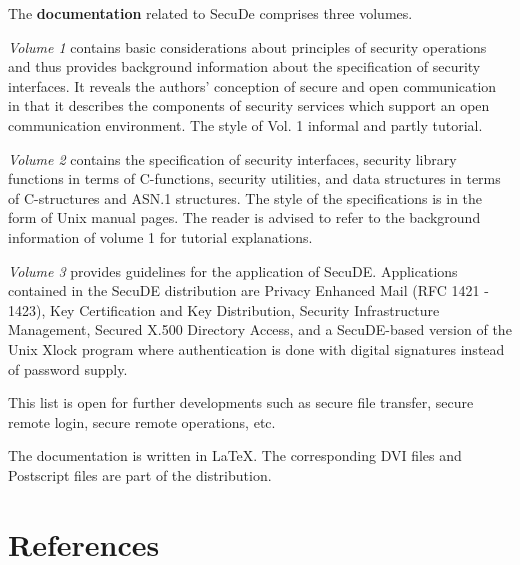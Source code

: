 The {\bf documentation} related to SecuDe comprises three volumes.

{\em Volume 1} contains basic considerations
about principles of security operations and thus provides
background information about the specification of security interfaces.
It reveals
the authors' conception of secure and open communication
in that it describes
the components of security services
which support an open communication environment.
The style of Vol. 1 informal and
partly tutorial.

{\em Volume 2} contains the specification of security interfaces,
security library functions in terms of C-functions, security
utilities, and data structures in terms of C-structures
and ASN.1 structures.
The style of the specifications is in the form of 
Unix manual pages.
The reader is advised to refer to the background information
of volume 1 for tutorial explanations.

{\em Volume 3}  provides guidelines for the application of  SecuDE.
Applications contained in the SecuDE distribution are Privacy Enhanced 
Mail (RFC 1421 - 1423), Key Certification and Key Distribution, Security
Infrastructure Management, Secured X.500 Directory Access, and a 
SecuDE-based version of the Unix Xlock program where authentication
is done with digital signatures instead of password supply.

This list is open for further developments such as secure file transfer,
secure remote login, secure remote operations, etc.

The documentation is written
in \LaTeX. The corresponding DVI files and Postscript files are part of the distribution.

\section{References}
\pagestyle{myheadings}

